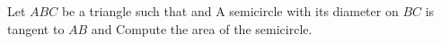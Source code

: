 Let $ABC$ be a triangle such that   and   A semicircle with its diameter on $BC$ is tangent to $AB$ and   Compute the area of the semicircle.